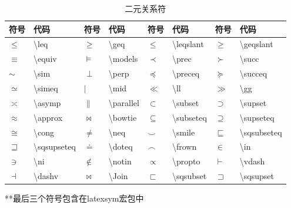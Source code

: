 \documentclass[UTF8,fontset=ubuntu]{ctexart}
\begin{document}
\begin{table}[H]
\begin{tabular}{l l l l l l l l}
    \hline
    符号 & 代码 & 符号 & 代码 & 符号 & 代码 & 符号 & 代码\\\hline
	$\leq$ & \textbackslash leq & $\geq$ & \textbackslash geq & $\leqslant$ & \textbackslash leqslant & $\geqslant$ & \textbackslash geqslant\\
    $\equiv$ & \textbackslash equiv & $\models$ & \textbackslash models & $\prec$ & \textbackslash prec & $\succ$ & \textbackslash succ\\
    $\sim$ & \textbackslash sim & $\perp$ & \textbackslash perp & $\preceq$ & \textbackslash preceq & $\succeq$ & \textbackslash succeq\\
    $\simeq$ & \textbackslash simeq & $\mid$ & \textbackslash mid & $\ll$ & \textbackslash ll & $\gg$ & \textbackslash gg\\
    $\asymp$ & \textbackslash asymp & $\parallel$ & \textbackslash parallel & $\subset$ & \textbackslash subset & $\supset$ & \textbackslash supset\\
    $\approx$ & \textbackslash approx & $\bowtie$ & \textbackslash bowtie & $\subseteq$ & \textbackslash subseteq & $\supseteq$ & \textbackslash supseteq\\
    $\cong$ & \textbackslash cong & $\neq$ & \textbackslash neq & $\smile$ & \textbackslash smile & $\sqsubseteq$ & \textbackslash sqsubseteq\\
    $\sqsupseteq$ & \textbackslash sqsupseteq & $\doteq$ & \textbackslash doteq & $\frown$ & \textbackslash frown & $\in$ & \textbackslash in\\
    $\ni$ & \textbackslash ni & $\notin$ & \textbackslash notin & $\propto$ & \textbackslash propto & $\vdash$ & \textbackslash vdash\\
    $\dashv$ & \textbackslash dashv & $\Join$ & \textbackslash Join & $\sqsubset$ & \textbackslash sqsubset & $\sqsupset$ & \textbackslash sqsupset\\
    \hline
\end{tabular}
**最后三个符号包含在latexsym宏包中
\caption{二元关系符}
\end{table}
\end{document}
